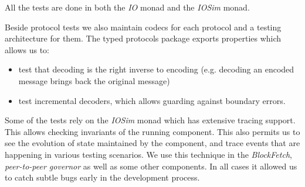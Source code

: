 \documentclass[11pt,a4paper]{article}
\begin{document}
All the tests are done in both the \emph{IO} monad and the \emph{IOSim}
monad.

Beside protocol tests we also maintain codecs for each protocol and a
testing architecture for them. The typed protocols package exports
properties which allows us to:

\begin{itemize}
\item
  test that decoding is the right inverse to encoding (e.g. decoding an
  encoded message brings back the original message)
\item
  test incremental decoders, which allows guarding against boundary
  errors.
\end{itemize}

Some of the tests rely on the \emph{IOSim} monad which has extensive
tracing support. This allows checking invariants of the running
component. This also permits us to see the evolution of state maintained
by the component, and trace events that are happening in various testing
scenarios. We use this technique in the \emph{BlockFetch},
\emph{peer-to-peer governor} as well as some other components. In all
cases it allowed us to catch subtle bugs early in the development
process.



\end{document}
